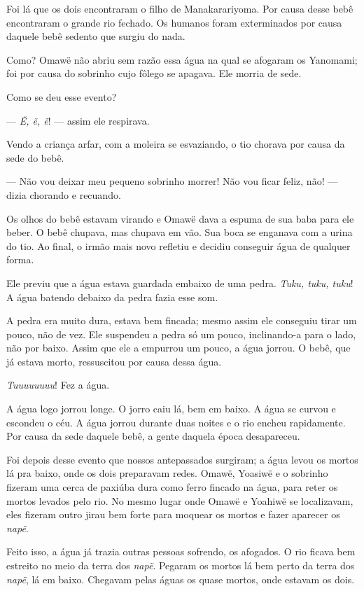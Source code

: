 Foi lá que os dois encontraram o filho de Manakarariyoma. Por causa
desse bebê encontraram o grande rio fechado. Os humanos foram
exterminados por causa daquele bebê sedento que surgiu do nada. 

Como? Omawë não abriu sem razão essa água na qual se afogaram os
Yanomami; foi por causa do sobrinho cujo fôlego se apagava. Ele morria de
sede. 

Como se deu esse evento?

--- \textit{Ẽ, ẽ, ẽ}! --- assim ele respirava. 

Vendo a criança arfar, com a moleira se esvaziando, o tio chorava por
causa da sede do bebê. 

--- Não vou deixar meu pequeno sobrinho morrer! Não vou ficar feliz,
não! --- dizia chorando e recuando. 

Os olhos do bebê estavam virando e Omawë dava a espuma de sua baba para
ele beber. O bebê chupava, mas chupava em vão. Sua boca se enganava com a
urina do tio. Ao final, o irmão mais novo refletiu e decidiu conseguir água de qualquer forma. 

Ele previu que a água estava guardada embaixo de uma pedra. \textit{Tuku, tuku, tuku}! A água batendo debaixo da pedra fazia esse som. 

A pedra era muito dura, estava bem fincada; mesmo assim ele conseguiu
tirar um pouco, não de vez. Ele suspendeu a pedra só um pouco,
inclinando-a para o lado, não por baixo. Assim que ele a empurrou um pouco, a
água jorrou. O bebê, que já estava morto, ressuscitou por causa dessa
água.

\textit{Tuuuuuuuu}! Fez a água. 

A água logo jorrou longe. O jorro caiu lá, bem em baixo. A água se
curvou e escondeu o céu. A água jorrou durante duas noites e o rio
encheu rapidamente. Por causa da sede daquele bebê, a gente daquela
época desapareceu. 

Foi depois desse evento que nossos antepassados surgiram; a água levou
os mortos lá pra baixo, onde os dois preparavam redes. Omawë, Yoasiwë e o
sobrinho fizeram uma cerca de paxiúba dura como ferro fincado na água,
para reter os mortos levados pelo rio. No mesmo lugar onde Omawë e
Yoahiwë se localizavam, eles fizeram outro jirau bem forte para moquear
os mortos e fazer aparecer os \textit{napë}. 

Feito isso, a água já trazia outras pessoas sofrendo, os afogados. O rio ficava bem estreito no meio da terra dos \textit{napë}. Pegaram os
mortos lá bem perto da terra dos \textit{napë}, lá em baixo. Chegavam
pelas águas os quase mortos, onde estavam os dois. 

